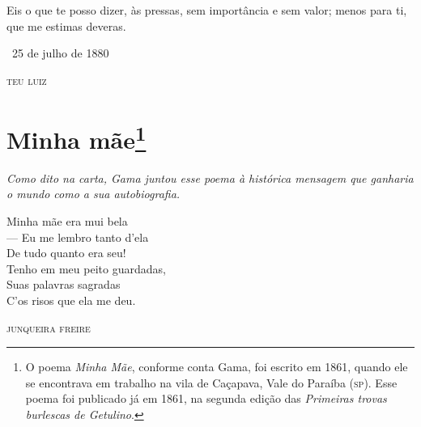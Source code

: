Eis o que te posso dizer, às pressas, sem importância e sem valor; menos
para ti, que me estimas deveras.

\medskip

\hfill\ 25 de julho de 1880

\hfill\textsc{teu luiz}


\chapter{Minha mãe\footnote{O poema \emph{Minha Mãe}, conforme
  conta Gama, foi escrito em 1861, quando ele se encontrava em trabalho
  na vila de Caçapava, Vale do Paraíba (\textsc{sp}). Esse poema foi publicado já
  em 1861, na segunda edição das \emph{Primeiras trovas burlescas de
  Getulino}.}}

\begin{resumo}
\emph{Como dito na carta, Gama juntou esse poema à histórica mensagem
que ganharia o mundo como a sua autobiografia. }
\end{resumo}

{\setlength{\epigraphwidth}{.45\textwidth} 
\epigraph{Minha mãe era mui bela\\
--- Eu me lembro tanto d'ela\\
De tudo quanto era seu!\\
Tenho em meu peito guardadas,\\
Suas palavras sagradas\\
C'os risos que ela me deu.}{\textsc{junqueira freire}\footnotemark}}

